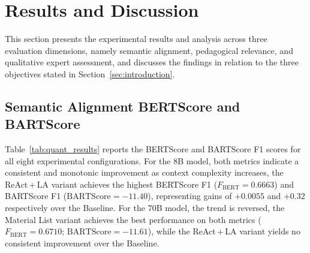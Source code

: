\documentclass[conference,a4paper]{IEEEtran}
\begin{document}


\section{Results and Discussion}\label{sec:results}

This section presents the experimental results and 
analysis across three evaluation dimensions, namely semantic
alignment, pedagogical relevance, and qualitative
expert assessment, and discusses the findings in 
relation to the three objectives stated
in Section~\ref{sec:introduction}.

\subsection{Semantic Alignment BERTScore and BARTScore}

Table~\ref{tab:quant_results} reports the BERTScore
and BARTScore F1 scores for all eight experimental
configurations. For the 8B model, both metrics
indicate a consistent and monotonic improvement as
context complexity increases, the ReAct\,+\,LA
variant achieves the highest BERTScore F1
($F_{\text{BERT}} = 0.6663$) and BARTScore F1
($\text{BARTScore} = -11.40$), representing gains
of $+0.0055$ and $+0.32$ respectively over the
Baseline. For the 70B model, the trend is reversed,
the Material List variant achieves the best
performance on both metrics
($F_{\text{BERT}} = 0.6710$;
$\text{BARTScore} = -11.61$),
while the ReAct\,+\,LA variant yields no consistent
improvement over the Baseline.
\end{document}
